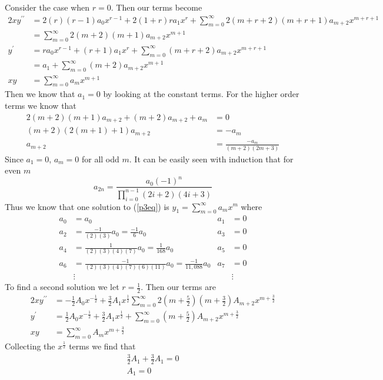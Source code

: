 \documentclass[12pt]{article}
\begin{document}
	Consider the case when $r=0$. Then our terms become
	\begin{align*}
		2xy^{\prime\prime} & = 2(r)(r-1)a_0x^{r-1} + 2(1+r)ra_1x^{r} + \sum_{m=0}^\infty 2(m+r+2)(m+r+1)a_{m+2}x^{m+r+1} \\
		& = \sum_{m=0}^\infty 2(m+2)(m+1)a_{m+2}x^{m+1} \\
		y^\prime & = ra_0x^{r-1} + (r+1)a_1x^{r} + \sum_{m=0}^\infty(m+r+2)a_{m+2}x^{m+r+1} \\
		& = a_1 + \sum_{m=0}^\infty(m+2)a_{m+2}x^{m+1} \\
		xy & = \sum_{m=0}^\infty a_m x^{m+1}
	\end{align*}
	Then we know that $a_1 = 0$ by looking at the constant terms. For the higher order terms we know that
	\begin{align*}
		2(m+2)(m+1)a_{m+2} + (m+2)a_{m+2} + a_m & = 0 \\
		(m+2)(2(m+1) + 1)a_{m+2} & = -a_m \\
		a_{m+2} & = \frac{-a_m}{(m+2)(2m+3)}
	\end{align*}
	Since $a_1=0$, $a_m = 0$ for all odd $m$. It can be easily seen with induction that for even $m$
	$$
	a_{2n} = \frac{a_0(-1)^{n}}{\prod\limits_{i=0}^{n-1}(2i+2)(4i+3)}
	$$
	Thus we know that one solution to (\ref{p3eq}) is $y_1 =  \sum_{m=0}^\infty a_m x^m$ where 
	\begin{align*}
		a_0 & = a_0 & a_1 & = 0 \\
		a_2 & = \tfrac{-1}{(2)(3)}a_0 = \tfrac{-1}{6}a_0 & a_3 & = 0 \\
		a_4 & = \tfrac{1}{(2)(3)(4)(7)}a_0 = \tfrac{1}{168}a_0 & a_5 & = 0 \\
		a_6 & = \tfrac{-1}{(2)(3)(4)(7)(6)(11)}a_0 = \tfrac{-1}{11,088}a_0 & a_7 & = 0 \\
		& \vdots & & \vdots
	\end{align*}
	To find a second solution we let $r = \tfrac{1}{2}$. Then our terms are
	\begin{align*}
		2xy^{\prime\prime} & = -\tfrac{1}{2}A_0x^{-\frac{1}{2}} + \tfrac{3}{2}A_1x^{\frac{1}{2}}\sum_{m=0}^\infty 2(m + \tfrac{5}{2}) (m + \tfrac{3}{2}) A_{m+2} x^{m+\frac{3}{2}} \\
		y^\prime & = \tfrac{1}{2}A_0x^{-\frac{1}{2}} + \tfrac{3}{2}A_1x^{\frac{1}{2}} + \sum_{m=0}^\infty(m+\tfrac{5}{2})A_{m+2}x^{m+\frac{3}{2}} \\
		xy & = \sum_{m=0}^\infty A_m x^{m+\frac{3}{2}}
	\end{align*}
	Collecting the $x^\frac{1}{2}$ terms we find that
	\begin{align*}
		\tfrac{3}{2}A_1 + \tfrac{3}{2}A_1 = 0 \\
		A_1 = 0
	\end{align*}
\end{document}
